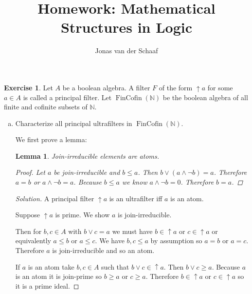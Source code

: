 \documentclass{article}
\title{Homework: Mathematical Structures in Logic}
\author{Jonas van der Schaaf}
\date{}
\newcommand{\N}{\mathbb{N}}
\renewcommand{\qedsymbol}{\raisebox{-0.5cm}{}}
\DeclareMathOperator{\fincofin}{FinCofin}
\newenvironment{solution}{\begin{proof}[Solution]\renewcommand\qedsymbol{}}{\end{proof}}
\newtheorem{lemma}[theorem]{Lemma}
\theoremstyle{definition}
\newtheorem{question}{Exercise}
\begin{document}
\maketitle

\begin{question}
    Let \(A\) be a boolean algebra. A filter \(F\) of the form \(\uparrow a\)
    for some \(a\in A\) is called a principal filter. Let \(\fincofin(\N)\) be
    the boolean algebra of all finite and cofinite subsets of \(\N\).

    \begin{enumerate}[a)]
        \item Characterize all principal ultrafilters in \(\fincofin(\N)\).

              We first prove a lemma:

              \begin{lemma}
                  Join-irreducible elements are atoms.

                  \begin{proof}
                      Let \(a\) be join-irreducible and \(b\leq a\). Then
                      \(b\vee(a\wedge\neg b)=a\). Therefore \(a=b\) or
                      \(a\wedge\neg b=a\). Because \(b\leq a\) we know
                      \(a\wedge\neg b=0\). Therefore \(b=a\).
                  \end{proof}
              \end{lemma}

              \begin{solution}
                  A principal filter \(\uparrow a\) is an ultrafilter iff \(a\)
                  is an atom.

                  Suppose \(\uparrow a\) is prime. We show \(a\) is
                  join-irreducible.

                  Then for \(b,c\in A\) with \(b\vee c=a\) we must have
                  \(b\in\uparrow a\) or \(c\in\uparrow a\) or equivalently
                  \(a\leq b\) or \(a\leq c\). We have \(b,c\leq a\) by
                  assumption so \(a=b\) or \(a=c\). Therefore \(a\) is
                  join-irreducible and so an atom.

                  If \(a\) is an atom take \(b,c\in A\) such that \(b\vee
                  c\in\uparrow a\). Then \(b\vee c\geq a\). Because \(a\) is an
                  atom it is join-prime so \(b\geq a\) or \(c\geq a\). Therefore
                  \(b\in\uparrow a\) or \(c\in\uparrow a\) so it is a prime
                  ideal.


\end{solution}
\end{enumerate}
\end{question}
\end{document}

